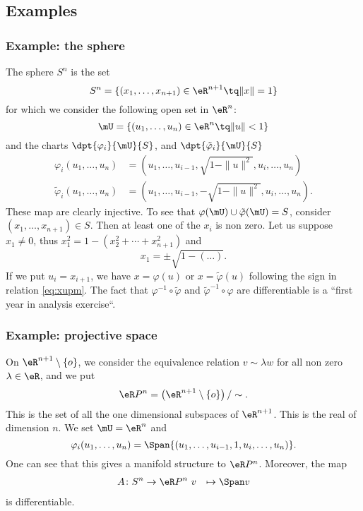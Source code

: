\subsection{Examples}

\subsubsection{Example: the sphere}

The sphere $S^n$ is the set
\[
  S^n=\{  (x_1,\ldots, x_{n+1})\in\eR^{n+1}\tq \|x\|=1  \}
\]
for which we consider the following open set in $\eR^n$:
\[
   \mU=\{  (u_1,\ldots,u_n)\in\eR^n\tq\|u\|<1  \}
\]
and the charts $\dpt{\varphi_i}{\mU}{S}$, and $\dpt{\tilde{\varphi}_i}{\mU}{S}$
\begin{subequations}
\begin{align}
   \varphi_i(u_1,\ldots,u_n)&=(u_1,\ldots,u_{i-1}, \sqrt{  1-\|u\|^2  },u_i,\ldots,u_n )\\
   \tilde{\varphi}_i(u_1,\ldots,u_n)&=(u_1,\ldots,u_{i-1}, -\sqrt{  1-\|u\|^2  },u_i,\ldots,u_n ).
\end{align}
\end{subequations}
These map are clearly injective. To see that $\varphi(\mU)\cup\tilde{\varphi}(\mU)=S$, consider $(x_1,\ldots,x_{n+1})\in S$. Then at least one of the $x_i$ is non zero. Let us suppose $x_1\neq 0$, thus $x_1^2=1-(x_2^2+\cdots+x_{n+1}^2)$ and
\begin{equation}\label{eq:xupm}
   x_1=\pm\sqrt{1-(\ldots)}.
\end{equation}
If we put $u_i=x_{i+1}$, we have $x=\varphi(u)$ or $x=\tilde{\varphi}(u)$ following the sign in relation \eqref{eq:xupm}. The fact that $\varphi^{-1}\circ\tilde{\varphi}$ and $\tilde{\varphi}^{-1}\circ\varphi$ are differentiable is a ``first year in analysis exercise``.

\subsubsection{Example: projective space}

On $\eR^{n+1}\setminus\{o\}$, we consider the equivalence relation $v\sim\lambda w$ for all non zero $\lambda\in\eR$, and we put
\[
  \eR P^n=\left(\eR^{n+1}\setminus\{o\}\right)/\sim.
\]
This is the set of all the one dimensional subspaces of $\eR^{n+1}$. This is the real  of dimension $n$. We set $\mU=\eR^n$ and
\[
  \varphi_i(u_1,\ldots,u_n)=\Span\{ (u_1,\ldots,u_{i-1},1,u_i,\ldots,u_n) \}.
\]
One can see that this gives a manifold structure to $\eR P^n$. Moreover, the map
		\begin{equation}
		\begin{aligned}
			A \colon S^n &\to \eR P^n\
			v&\mapsto \Span v
		\end{aligned}
	\end{equation}
is differentiable.

